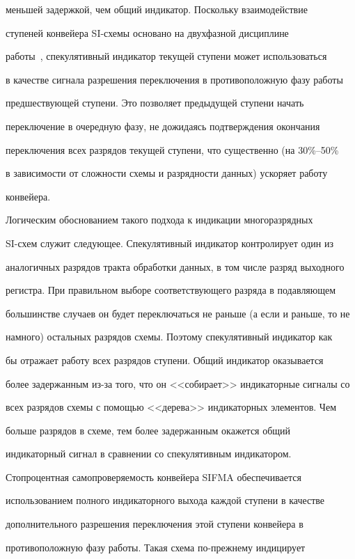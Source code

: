 меньшей задержкой, чем общий индикатор. Поскольку взаимодействие

ступеней конвейера SI-схе\-мы основано на двухфазной дисциплине

работы~\cite{17-st1}, спекулятивный индикатор текущей ступени может использоваться

в качестве сигнала разрешения переключения в противоположную фазу работы

предшествующей ступени. Это позволяет предыдущей ступени начать

переключение в очередную фазу, не дожидаясь подтверждения окончания

переключения всех разрядов текущей ступени, что существенно (на 30\%--50\%

в зависимости от сложности схемы и разрядности данных) ускоряет работу

конвейера.



      Логическим обоснованием такого подхода к индикации многоразрядных

SI-схем служит следующее. Спекулятивный индикатор контролирует один из

аналогичных разрядов тракта обработки данных, в том числе разряд выходного

регистра. При правильном выборе соответствующего разряда в подавляющем

большинстве случаев он будет переключаться не раньше (а если и раньше, то не

намного) остальных разрядов схемы. Поэтому спекулятивный индикатор как

бы отражает работу всех разрядов ступени. Общий индикатор оказывается

более задержанным из-за того, что он <<собирает>> индикаторные сигналы со

всех разрядов схемы с помощью <<дерева>> индикаторных элементов. Чем

больше разрядов в схеме, тем более задержанным окажется общий

индикаторный сигнал в сравнении со спекулятивным индикатором.



      Стопроцентная самопроверяемость конвейера SIFMA обеспечивается

использованием полного индикаторного выхода каждой ступени в качестве

дополнительного разрешения переключения этой ступени конвейера в

противоположную фазу работы. Такая схема по-преж\-не\-му индицирует

